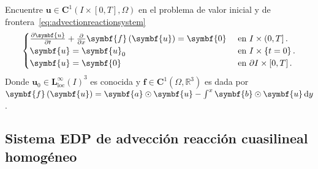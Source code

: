 Encuentre
\begin{math}
	\symbf{u}\in
	\symbf{C}^{1}\left(I\times\left[0,T\right],\Omega\right)
\end{math}
en el problema de valor inicial y de frontera~\eqref{eq:advectionreactionsystem}
\begin{equation}\label{eq:advectionreactionsystem}
	\begin{cases}
		\diffp{\symbf{u}}{t}+\diffp{}{x}\symbf{f}\left(\symbf{u}\right)               =
		\symbf{0}     &
		\text{ en }I\times\left(0,T\right].   \\
		\symbf{u}                                                                     =
		\symbf{u}_{0} &
		\text{ en }I\times\left\{t=0\right\}. \\
		\symbf{u}                                                                     =
		\symbf{0}     &
		\text{ en }\partial I\times\left[0,T\right].
	\end{cases}
\end{equation}
Donde
\begin{math}
	\symbf{u}_{0}\in
	{\symbf{L}^{\infty}_{\text{loc}}\left(I\right)}^{3}
\end{math}
es conocida y
\begin{math}
	\symbf{f}\in
	\symbf{C}^{1}
	\left(\Omega,\mathbb{R}^{3}\right)
\end{math}
es dada por
\begin{math}
	\symbf{f}\left(\symbf{u}\right)=
	\symbf{a}\odot\symbf{u}-
	\int^{x}\symbf{b}\odot\symbf{u}\dl y
\end{math}.

\subsection*{Sistema EDP de advección reacción cuasilineal homogéneo}

